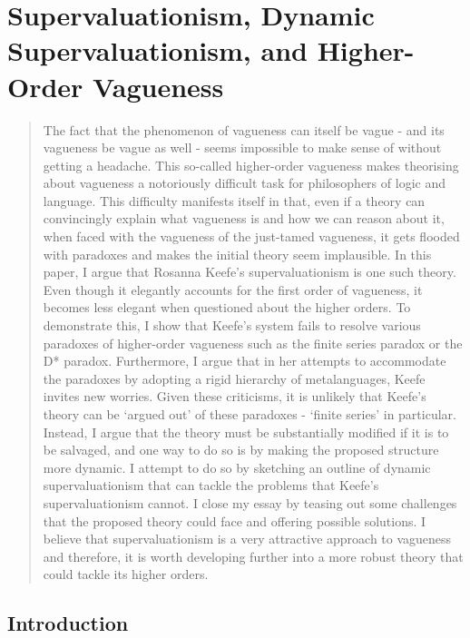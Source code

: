 \chapter{Supervaluationism, Dynamic Supervaluationism, and Higher-Order Vagueness}
\renewcommand*{\thesection}{\arabic{section}.}
\renewcommand*{\thesubsection}{\arabic{section}.\arabic{subsection}.}

\begin{quote}
The fact that the phenomenon of vagueness can itself be vague
- and its vagueness be vague as well - seems impossible to make sense of
without getting a headache. This so-called higher-order vagueness makes
theorising about vagueness a notoriously difficult task for philosophers
of logic and language. This difficulty manifests itself in that, even if
a theory can convincingly explain what vagueness is and how we can
reason about it, when faced with the vagueness of the just-tamed
vagueness, it gets flooded with paradoxes and makes the initial theory
seem implausible. In this paper, I argue that Rosanna Keefe's
supervaluationism is one such theory. Even though it elegantly accounts
for the first order of vagueness, it becomes less elegant when
questioned about the higher orders. To demonstrate this, I show that
Keefe's system fails to resolve various paradoxes of higher-order
vagueness such as the finite series paradox or the D* paradox.
Furthermore, I argue that in her attempts to accommodate the paradoxes
by adopting a rigid hierarchy of metalanguages, Keefe invites new
worries. Given these criticisms, it is unlikely that Keefe's theory can
be `argued out' of these paradoxes - `finite series' in particular.
Instead, I argue that the theory must be substantially modified if it is
to be salvaged, and one way to do so is by making the proposed structure
more dynamic. I attempt to do so by sketching an outline of dynamic
supervaluationism that can tackle the problems that Keefe's
supervaluationism cannot. I close my essay by teasing out some
challenges that the proposed theory could face and offering possible
solutions. I believe that supervaluationism is a very attractive
approach to vagueness and therefore, it is worth developing further into
a more robust theory that could tackle its higher orders.
\end{quote}

\section{Introduction}

